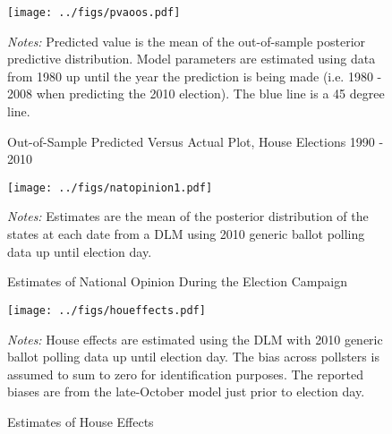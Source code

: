 \documentclass[12pt,final,fleqn]{article}
\theoremstyle{plain}
\begin{document}
\begin{appendices}
\iffalse
\begin{figure}[!htb]
\texttt{[image: ../figs/pva.pdf]}
\vspace{.5cm}
\caption{In-Sample Predicted Versus Actual Plot, House Elections 1980 - 2008}
\label{fig:In-Sample Predicted Versus Actual Plot, House Elections 1980 - 2008}
\begin{minipage}{\linewidth}
\footnotesize
\emph{Notes:} Predicted value is the mean of the in-sample posterior predictive distribution ($v^{rep}$). Model parameters are estimated using data from 1980 to 2008. The blue line is a 45 degree line.
\end{minipage}
\end{figure}
\fi

\begin{figure}[!htb]
\texttt{[image: ../figs/pvaoos.pdf]}
\vspace{.5cm}
\caption{Out-of-Sample Predicted Versus Actual Plot, House Elections 1990 - 2010}
\label{fig:Out-of-Sample Predicted Versus Actual Plot, House Elections 1990 - 2010}
\begin{minipage}{\linewidth}
\footnotesize
\emph{Notes:} Predicted value is the mean of the out-of-sample posterior predictive distribution. Model parameters are estimated using data from 1980 up until the year the prediction is being made (i.e. 1980 - 2008 when predicting the 2010 election). The blue line is a 45 degree line. 
\end{minipage}
\end{figure}

\begin{figure}[!htb]
\centering
\texttt{[image: ../figs/natopinion1.pdf]}
\vspace{.5cm}
\caption{Estimates of National Opinion During the Election Campaign}
\label{fig:Estimates of National Opinion During the Election Campaign}
\begin{minipage}{\linewidth}
\footnotesize
\emph{Notes:} Estimates are the mean of the posterior distribution of the states at each date from a DLM using 2010 generic ballot polling data up until election day.
\end{minipage}
\end{figure}

\begin{figure}[!htb]
\begin{center}
\texttt{[image: ../figs/houeffects.pdf]}
\vspace{.5cm}
\caption{Estimates of House Effects}
\label{fig:Estimates of House Effects}
\begin{minipage}{\linewidth}
\footnotesize
\emph{Notes:} House effects are estimated using the DLM with 2010 generic ballot polling data up until election day. The bias across pollsters is assumed to sum to zero for identification purposes. The reported biases are from the late-October model just prior to election day.
\end{minipage}
\end{center}
\end{figure}


\end{appendices}
\end{document}
